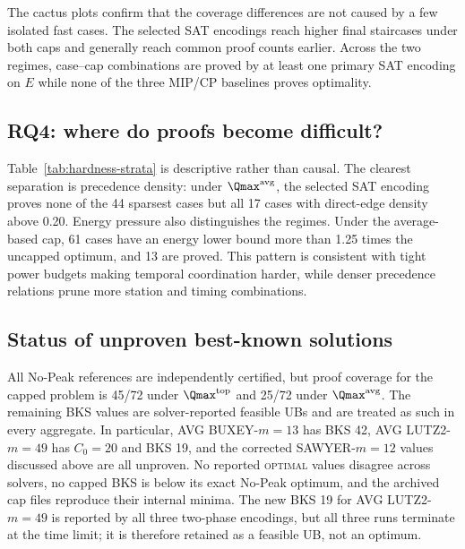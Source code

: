

The cactus plots confirm that the coverage differences are not caused by a
few isolated fast cases. The selected SAT encodings reach higher final
staircases under both caps and generally reach common proof counts earlier.
Across the two regimes, \HardCaseCount{} case--cap combinations are proved by
at least one primary SAT encoding on \(E\) while none of the three MIP/CP
baselines proves optimality.

\subsection{RQ4: where do proofs become difficult?}



Table~\ref{tab:hardness-strata} is descriptive rather than causal. The
clearest separation is precedence density: under
\(\Qmax^{\mathrm{avg}}\), the selected SAT encoding proves none of the 44
sparsest cases but all 17 cases with direct-edge density above 0.20. Energy
pressure also distinguishes the regimes. Under the average-based cap, 61
cases have an energy lower bound more than 1.25 times the uncapped optimum,
and 13 are proved. This pattern is consistent with tight power budgets
making temporal coordination harder, while denser precedence relations prune
more station and timing combinations.

\subsection{Status of unproven best-known solutions}

All No-Peak references are independently certified, but proof coverage for
the capped problem is 45/72 under \(\Qmax^{\mathrm{top}}\) and 25/72 under
\(\Qmax^{\mathrm{avg}}\). The remaining BKS values are solver-reported
feasible UBs and are treated as such in every aggregate. In particular, AVG BUXEY-\(m=13\) has
BKS 42, AVG LUTZ2-\(m=49\) has \(C_0=20\) and BKS 19, and the corrected
SAWYER-\(m=12\) values discussed above are all unproven. No reported
\textsc{optimal} values disagree across solvers, no capped BKS is below its
exact No-Peak optimum, and the archived cap files reproduce their internal
minima. The new BKS 19 for AVG LUTZ2-\(m=49\) is reported by all three
two-phase encodings, but all three runs terminate at the time limit; it is
therefore retained as a feasible UB, not an optimum.
